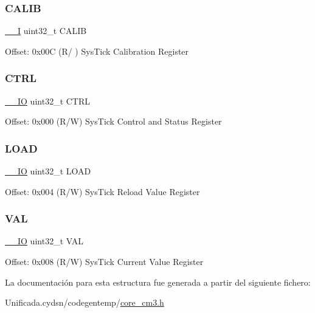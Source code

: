 \subsubsection{\texorpdfstring{C\+A\+L\+IB}{CALIB}}
{\footnotesize\ttfamily \mbox{\hyperlink{core__cm3_8h_af63697ed9952cc71e1225efe205f6cd3}{\+\_\+\+\_\+I}} uint32\+\_\+t C\+A\+L\+IB}

Offset\+: 0x00C (R/ ) Sys\+Tick Calibration Register \mbox{\label{struct_sys_tick___type_a15fc8d35f045f329b80c544bef35ff64}} 
\subsubsection{\texorpdfstring{C\+T\+RL}{CTRL}}
{\footnotesize\ttfamily \mbox{\hyperlink{core__cm3_8h_aec43007d9998a0a0e01faede4133d6be}{\+\_\+\+\_\+\+IO}} uint32\+\_\+t C\+T\+RL}

Offset\+: 0x000 (R/W) Sys\+Tick Control and Status Register \mbox{\label{struct_sys_tick___type_aad9adf4efc940cddb8161b69cfbe19d3}} 
\subsubsection{\texorpdfstring{L\+O\+AD}{LOAD}}
{\footnotesize\ttfamily \mbox{\hyperlink{core__cm3_8h_aec43007d9998a0a0e01faede4133d6be}{\+\_\+\+\_\+\+IO}} uint32\+\_\+t L\+O\+AD}

Offset\+: 0x004 (R/W) Sys\+Tick Reload Value Register \mbox{\label{struct_sys_tick___type_a26fb318c3b0a0ec7f45daafd5f8799a3}} 
\subsubsection{\texorpdfstring{V\+AL}{VAL}}
{\footnotesize\ttfamily \mbox{\hyperlink{core__cm3_8h_aec43007d9998a0a0e01faede4133d6be}{\+\_\+\+\_\+\+IO}} uint32\+\_\+t V\+AL}

Offset\+: 0x008 (R/W) Sys\+Tick Current Value Register 

La documentación para esta estructura fue generada a partir del siguiente fichero\+:\begin{DoxyCompactItemize}
\item 
Unificada.\+cydsn/codegentemp/\mbox{\hyperlink{core__cm3_8h}{core\+\_\+cm3.\+h}}\end{DoxyCompactItemize}
